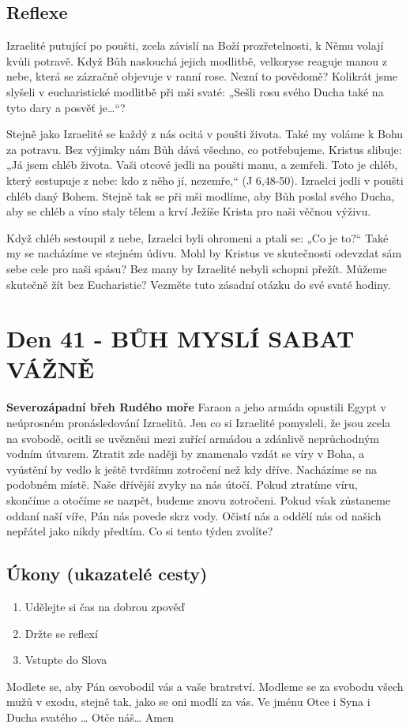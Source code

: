 \documentclass[11pt]{article}
\newcommand{\zacatekSestyTyden}{
  \textbf{Severozápadní břeh Rudého moře} \newline 
  Faraon a jeho armáda opustili Egypt v neúprosném pronásledování Izraelitů. Jen co si Izraelité pomysleli, že jsou zcela na svobodě, ocitli se uvězněni mezi zuřící armádou a zdánlivě neprůchodným vodním útvarem. Ztratit zde naději by znamenalo vzdát se víry v Boha, a vyústění by vedlo k ještě tvrdšímu zotročení než kdy dříve. Nacházíme se na podobném místě. Naše dřívější zvyky na nás útočí. Pokud ztratíme víru, skončíme a otočíme se nazpět, budeme znovu zotročeni. Pokud však zůstaneme oddaní naší víře, Pán nás povede skrz vody. Očistí nás a oddělí nás od našich nepřátel jako nikdy předtím. Co si tento týden zvolíte?

\subsection*{Úkony (ukazatelé cesty)}
\begin{enumerate}
  \item Udělejte si čas na dobrou zpověď
  \item Držte se reflexí
  \item Vstupte do Slova
\end{enumerate}
Modlete se, aby Pán osvobodil vás a vaše bratrství. \newline
Modleme se za svobodu všech mužů v exodu, stejně tak, jako se oni modlí za vás.\newline
Ve jménu Otce i Syna i Ducha svatého …  Otče náš… Amen
}
\begin{document}
\subsection*{Reflexe}
Izraelité putující po poušti, zcela závislí na Boží prozřetelnosti, k Němu volají kvůli potravě. Když Bůh naslouchá jejich modlitbě,
velkoryse reaguje manou z nebe, která se zázračně objevuje v ranní rose. Nezní to povědomě? Kolikrát jsme slyšeli
v eucharistické modlitbě při mši svaté: „Sešli rosu svého Ducha také na tyto dary a posvěť je…“?

Stejně jako Izraelité se každý z nás ocitá v poušti života. Také my voláme k Bohu za potravu. Bez výjimky nám Bůh dává všechno,
co potřebujeme. Kristus slibuje: „Já jsem chléb života. Vaši otcové jedli na poušti manu, a zemřeli. Toto je chléb, který sestupuje z
nebe: kdo z něho jí, nezemře,“ (J 6,48-50). Izraelci jedli v poušti chléb daný Bohem. Stejně tak se při mši modlíme, aby Bůh poslal
svého Ducha, aby se chléb a víno staly tělem a krví Ježíše Krista pro naši věčnou výživu.

Když chléb sestoupil z nebe, Izraelci byli ohromeni a ptali se: „Co je to?“ Také my se nacházíme ve stejném údivu. Mohl by
Kristus ve skutečnosti odevzdat sám sebe cele pro naši spásu? Bez many by Izraelité nebyli schopni přežít. Můžeme skutečně žít
bez Eucharistie? Vezměte tuto zásadní otázku do své svaté hodiny.



\newpage
\section{Den 41 - BŮH MYSLÍ SABAT VÁŽNĚ }
\zacatekSestyTyden
\end{document}
